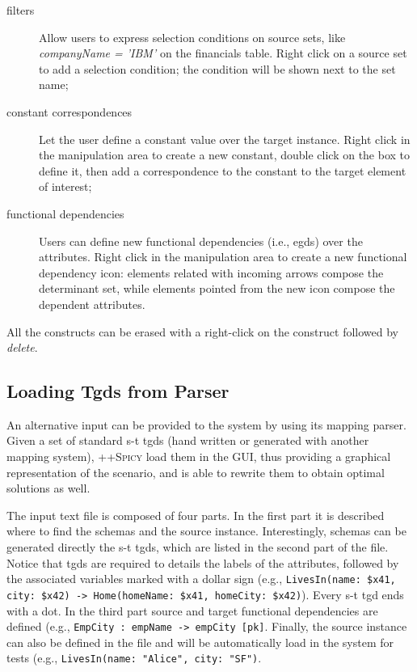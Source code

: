 \documentclass[12pt]{article}
\newcommand{\spicypp}{\textsc{++Spicy}}
\begin{document}
\begin{description}
\item [filters] Allow users to express selection conditions on source sets, like \emph{companyName = 'IBM'} on the financials table. Right click on a source set to add a selection condition; the condition will be shown next to the set name;

\item [constant correspondences] Let the user define a constant value over the target instance. Right click in the manipulation area to create a new constant, double click on the box to define it, then add a correspondence to the constant to the target element of interest;

\item [functional dependencies] Users can define new functional dependencies (i.e., egds) over the attributes.
Right click in the manipulation area to create a new functional dependency icon: elements related with incoming arrows compose the determinant set, while elements pointed from the new icon compose the dependent attributes. 

\end{description}

All the constructs can be erased with a right-click on the construct followed by {\em delete}.

\subsection{Loading Tgds from Parser} \label{sec:parser}

An alternative input can be provided to the system by using its mapping parser. Given a set of standard s-t tgds (hand written or generated with another mapping system), {\spicypp} load them in the GUI, thus providing a graphical representation of the scenario, and is able to rewrite them to obtain optimal solutions as well.
 
The input text file is composed of four parts. In the first part it is described where to find the schemas and the source instance. Interestingly, schemas can be generated directly the s-t tgds, which are listed in the second part of the file.
Notice that tgds are required to details the labels of the attributes, followed by the associated variables marked with a dollar sign (e.g., {\tt LivesIn(name: \$x41, city: \$x42) -> Home(homeName: \$x41, homeCity: \$x42)}). Every s-t tgd ends with a dot.
In the third part source and target functional dependencies are defined (e.g., {\tt EmpCity : empName -> empCity [pk]}. Finally, the source instance can also be defined in the file and will be automatically load in the system for tests (e.g., {\tt LivesIn(name: "Alice", city: "SF")}.
\end{document}
